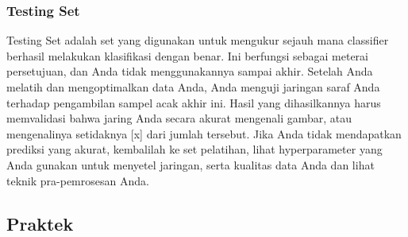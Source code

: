 \subsubsection{Testing Set}
Testing Set adalah set yang digunakan untuk mengukur sejauh mana classifier berhasil melakukan klasifikasi dengan benar. Ini berfungsi sebagai meterai persetujuan, dan Anda tidak menggunakannya sampai akhir. Setelah Anda melatih dan mengoptimalkan data Anda, Anda menguji jaringan saraf Anda terhadap pengambilan sampel acak akhir ini. Hasil yang dihasilkannya harus memvalidasi bahwa jaring Anda secara akurat mengenali gambar, atau mengenalinya setidaknya [x] dari jumlah tersebut. Jika Anda tidak mendapatkan prediksi yang akurat, kembalilah ke set pelatihan, lihat hyperparameter yang Anda gunakan untuk menyetel jaringan, serta kualitas data Anda dan lihat teknik pra-pemrosesan Anda.

\subsection{Praktek}
